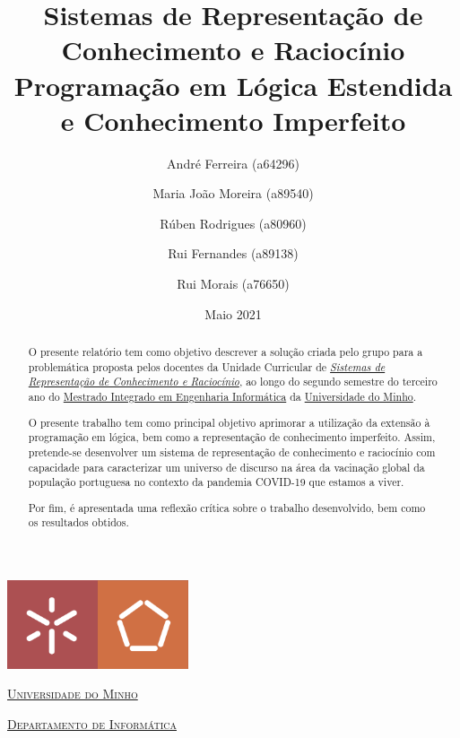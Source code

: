 \documentclass[a4paper, 11pt]{article}
\title{Sistemas de Representação de \\ Conhecimento e Raciocínio\\ [0.8em] 
\smaller{}Programação em Lógica Estendida e Conhecimento Imperfeito}
\author{André Ferreira (a64296) \and Maria João Moreira (a89540) \and Rúben Rodrigues (a80960) 
\and Rui Fernandes (a89138)
\and Rui Morais (a76650)}
\date{Maio 2021}
\begin{document}
\begin{titlepage}
    \begin{center}
        \begin{minipage}{0.75\linewidth}
            \centering
            \includegraphics[width=0.4\textwidth]{img/EEUM.png}\par\vspace{1cm}
            \vspace{1.5cm}
            \href{https://www.uminho.pt/PT}{\scshape\LARGE Universidade do Minho} \par
            \vspace{1cm}
            \href{https://www.di.uminho.pt/}{\scshape\Large Departamento de Informática} \par
            \vspace{1.5cm}
            \maketitle
        \end{minipage}
    \end{center}
    \vspace{2cm}
    \thispagestyle{empty}
    \clearpage
\end{titlepage}


\begin{abstract}

O presente relatório tem como objetivo descrever a solução criada pelo grupo para a 
problemática proposta pelos docentes
da Unidade Curricular de 
\href{https://miei.di.uminho.pt/plano_estudos.html#sistemas_de_representa_o_de_conhecimento_e_racioc
_nio}
{\emph{Sistemas de Representação de Conhecimento e Raciocínio}}, ao longo do segundo semestre do 
terceiro ano do
\href{http://miei.di.uminho.pt}{Mestrado Integrado em Engenharia Informática} da 
\href{https://www.uminho.pt}{Universidade
do Minho}.

O presente trabalho tem como principal objetivo aprimorar a utilização da extensão à
programação em lógica, bem como a representação de conhecimento imperfeito. Assim, pretende-se 
desenvolver um sistema de representação de conhecimento e raciocínio
com capacidade para caracterizar um universo de discurso na área da vacinação global da 
população portuguesa no contexto
da pandemia COVID-19 que estamos a viver.

Por fim, é apresentada uma reflexão crítica sobre o trabalho desenvolvido, bem como os 
resultados obtidos.
\end{abstract}
\end{document}

